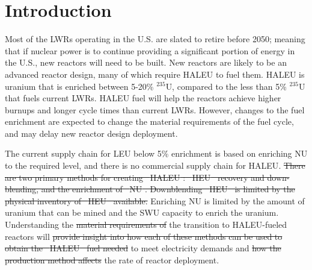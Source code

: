 \documentclass[preprint]{elsarticle}
\providecommand{\DIFaddtex}[1]{{\protect\color{blue}\uwave{#1}}} %
\providecommand{\DIFdeltex}[1]{{\protect\color{red}\sout{#1}}}                      %
\providecommand{\DIFaddbegin}{} %
\providecommand{\DIFaddend}{} %
\providecommand{\DIFdelbegin}{} %
\providecommand{\DIFdelend}{} %
\providecommand{\DIFadd}[1]{\texorpdfstring{\DIFaddtex{#1}}{#1}} %
\providecommand{\DIFdel}[1]{\texorpdfstring{\DIFdeltex{#1}}{}} %
\begin{document}
\linenumbers

\section{Introduction}

Most of the \glspl{LWR} operating in the U.S. are slated to retire
before 2050; meaning that if nuclear power is to continue providing a 
significant portion of energy in the U.S., new reactors will need to be built. 
New reactors are likely to be an advanced reactor design, many of 
which require \gls{HALEU} to fuel them. \gls{HALEU} is uranium that 
is enriched between 5-20\% $^{235}$U, compared to the less than 5\% $^{235}$U 
that fuels current \glspl{LWR}. \gls{HALEU} fuel will help 
the reactors achieve higher burnups and longer cycle times than current 
\glspl{LWR}. However, changes to the fuel enrichment are 
expected 
to change the material requirements of the fuel cycle, and may delay 
new reactor design deployment.

The current supply chain for \gls{LEU} below 5\% enrichment is based on 
enriching \gls{NU} to the required level, and there is no commercial 
supply chain for \gls{HALEU}.  
\DIFdelbegin \DIFdel{There are
two primary methods for creating \mbox{%
\gls{HALEU}}\hspace{0pt}%
: \mbox{%
\gls{HEU} }\hspace{0pt}%
recovery and 
down-blending, 
and the enrichment of \mbox{%
\gls{NU}}\hspace{0pt}%
. Downblending \mbox{%
\gls{HEU} }\hspace{0pt}%
is 
limited by the physical inventory of \mbox{%
\gls{HEU} }\hspace{0pt}%
available. 
}\DIFdelend Enriching \gls{NU} is limited by the amount of uranium that can be 
mined and the \gls{SWU} capacity to enrich the uranium. Understanding the 
\DIFdelbegin \DIFdel{material requirements of }\DIFdelend the transition to \gls{HALEU}-fueled reactors will \DIFdelbegin \DIFdel{provide insight into how each of these methods can be used 
to obtain the \mbox{%
\gls{HALEU} }\hspace{0pt}%
fuel needed }\DIFdelend \DIFaddbegin \DIFadd{inform the material 
requirements }\DIFaddend to meet electricity demands and 
\DIFdelbegin \DIFdel{how the production method affects }\DIFdelend the rate of reactor deployment.
\end{document}
